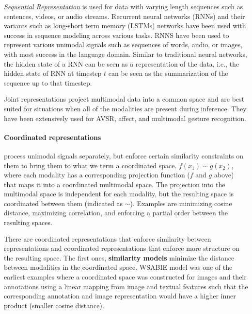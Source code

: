 \underline{\textit{Sequential Representation}} is used for data with varying length sequences such as sentences, videos, or audio streams. Recurrent neural networks (RNNs) and their variants such as long-short term memory (LSTMs) networks have been used with success in sequence modeling across various tasks. RNNS have been used to represent various unimodal signals such as sequences of words, audio, or images, with most success in the language domain. Similar to traditional neural networks, the hidden state of a RNN can be seen as a representation of the data, i.e., the hidden state of RNN at timestep $t$
can be seen as the summarization of the sequence up to that timestep.

Joint representations project multimodal data into a common space and are best suited for situations when all of the modalities are present during inference. They have been extensively used for AVSR, affect, and multimodal gesture recognition.
 
\paragraph{Coordinated representations} process unimodal signals separately, but enforce certain similarity constraints on them to bring them to what we term a coordinated space.
$f(x_1) \sim g(x_2)$,
where each modality has a corresponding projection function ($f$ and $g$ above) that maps it into a coordinated multimodal space.
The projection into the multimodal space is independent for each modality, but the resulting space is coordinated between them (indicated as $\sim$). Examples are minimizing cosine distance, maximizing correlation, and enforcing a partial order between the resulting spaces.

There are coordinated representations that enforce similarity between representations and coordinated representations that enforce more structure on the resulting space. The first ones, \textbf{similarity models} minimize the distance between modalities in the coordinated space. WSABIE model was one of the earliest examples where a coordinated space was constructed for images and their annotations using a linear mapping from image and textual features such that the corresponding annotation and image representation would have a higher inner product (smaller cosine distance).

